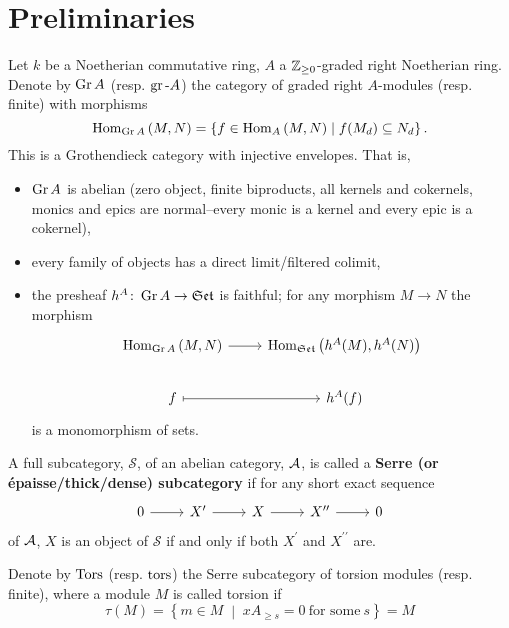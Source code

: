 \documentclass[dissertation.tex]{subfiles}
\begin{document}
\section{Preliminaries}
Let $k$ be a Noetherian commutative ring, $A$ a $\mathbb{Z}_{\geq 0}$-graded right Noetherian ring.
Denote by $\operatorname{Gr}A$ (resp. $\operatorname{gr}\text{-}A$) the category of graded right $A$-modules (resp. finite) with morphisms
$$\operatorname{Hom}_{\operatorname{Gr}A}\left(M,N\right) = \left\{f \in \operatorname{Hom}_{A}\left(M,N\right) \;\middle\vert\; f(M_d) \subseteq N_d\right\}.$$
This is a Grothendieck category with injective envelopes.
That is,
\begin{itemize}
\item
  $\operatorname{Gr}A$ is abelian (zero object, finite biproducts, all kernels and cokernels, monics and epics are normal--every monic is a kernel and every epic is a cokernel),
\item
  every family of objects has a direct limit/filtered colimit,
\item
  the presheaf $h^A \colon \operatorname{Gr}A \rightarrow \mathfrak{Set}$ is faithful; for any morphism $M \rightarrow N$ the morphism
  $$\begin{tikzcd}
    \Hom{\Gr{A}}{M, N} \arrow{r}& \Hom{\Sets}{h^A(M), h^A(N)}\\
    f \arrow[mapsto]{r} & h^A(f)
  \end{tikzcd}$$
  is a monomorphism of sets.
\end{itemize}

\begin{defn}
  A full subcategory, $\mathcal{S}$, of an abelian category, $\mathcal{A}$, is called a \textbf{Serre (or \'{e}paisse/thick/dense) subcategory} if for any short exact sequence
  $$\begin{tikzcd}
    0 \arrow{r} & X^\prime \arrow{r} & X \arrow{r} & X^{\prime\prime} \arrow{r} & 0
  \end{tikzcd}$$
  of $\mathcal{A}$, $X$ is an object of $\mathcal{S}$ if and only if both $X^\prime$ and $X^{\prime\prime}$ are.
\end{defn}

Denote by $\Tors$ (resp. $\operatorname{tors}$) the Serre subcategory of torsion modules (resp. finite), where a module $M$ is called torsion if
$$\tau(M) = \left\{m \in M \;\middle\vert\; xA_{\geq s} = 0\ \text{for some}\ s\right\} = M$$
\end{document}

